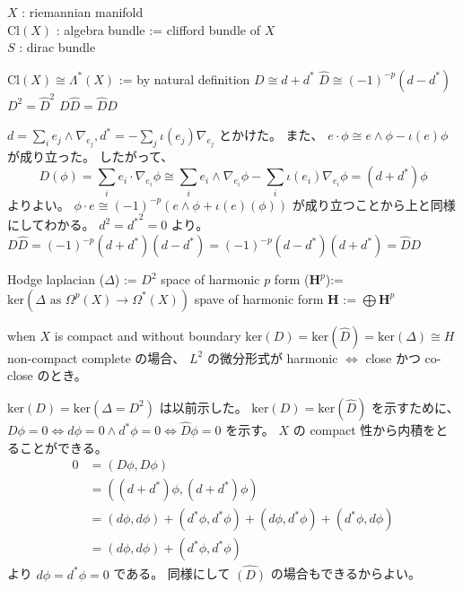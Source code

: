 \begin{When}
\itemwhen
  \Fix \(X\) : riemannian manifold \\
  \Let \(\text{Cl}(X)\) : algebra bundle := clifford bundle of \(X\) \\
  \Fix \(S\) : dirac bundle
\end{When}

\begin{Theorem}
\itemwhen
  \Let \(\text{Cl}(X) \cong \Lambda^*(X)\) := by natural definition
\itemprop
  \(D \cong d + d^*\)
\itemprop
  \(\hat{D} \cong (-1)^{-p}(d - d^*)\)
\itemprop
  \(D^2 = \hat{D}^2\)
\itemprof
  \(D \hat{D} = \hat{D} D\)
\end{Theorem}

\begin{Proof}
\itemprof
  \(d = \sum_i e_j \wedge \nabla_{e_j} , d^* = -\sum_j \iota(e_j) \nabla_{e_j}\) とかけた。
  また、 \(e \cdot \phi \cong e \wedge \phi - \iota(e) \phi\) が成り立った。
  したがって、
  \[D(\phi) = \sum_i e_i \cdot \nabla_{e_i} \phi \cong
  \sum_i e_i \wedge \nabla_{e_i} \phi - \sum_i \iota(e_i) \nabla_{e_i} \phi = (d + d^*) \phi\]
  よりよい。
\itemprof
  \(\phi \cdot e \cong (-1)^{-p}(e \wedge \phi + \iota(e)(\phi))\) が成り立つことから上と同様にしてわかる。
\itemprof
  \(d^2 = {d^*}^2 = 0\) より。
\itemprof
  \(D \hat{D} = (-1)^{-p} (d + d^*)(d - d^*) = (-1)^{-p}(d - d^*)(d + d^*) = \hat{D} D\)
\end{Proof}

\begin{Definition}
\itemdefi
  Hodge laplacian (\(\Delta\)) := \(D^2\)
\itemdefi
  space of harmonic \(p\) form (\(\mathbf{H}^p\)):= \(\text{ker}(\Delta \text{ as } \Omega^p(X) \to \Omega^*(X))\)
  spave of harmonic form \(\mathbf{H}\) := \(\bigoplus \mathbf{H}^p\)
\end{Definition}

\begin{Theorem}
\itemwhen
  when \(X\) is compact and without boundary
\itemprop
  \(\text{ker}(D) = \text{ker}(\hat{D}) = \text{ker}(\Delta) \cong H\)
\itemprof
  non-compact complete の場合、 \(L^2\) の微分形式が harmonic \(\iff\) close かつ co-close のとき。
\end{Theorem}

\begin{Proof}
\itemprof
  \(\text{ker}(D) = \text{ker}(\Delta = D^2)\) は以前示した。
  \(\text{ker}(D) = \text{ker}(\hat{D})\) を示すために、
  \(D \phi = 0 \iff d \phi = 0 \wedge d^* \phi = 0 \iff \hat{D}\phi = 0\) を示す。
  \(X\) の compact 性から内積をとることができる。
  \begin{align*}
  0
    &= (D \phi , D \phi) \\ 
    &= ((d + d^*) \phi , (d + d^*) \phi) \\
    &= (d \phi , d \phi) + (d^* \phi , d^* \phi) + (d \phi , d^* \phi) + (d^* \phi , d \phi) \\
    &= (d \phi , d \phi) + (d^* \phi , d^* \phi)
  \end{align*}
  より \(d \phi = d^* \phi = 0\) である。
  同様にして \(\hat{(D)}\) の場合もできるからよい。
\end{Proof}

